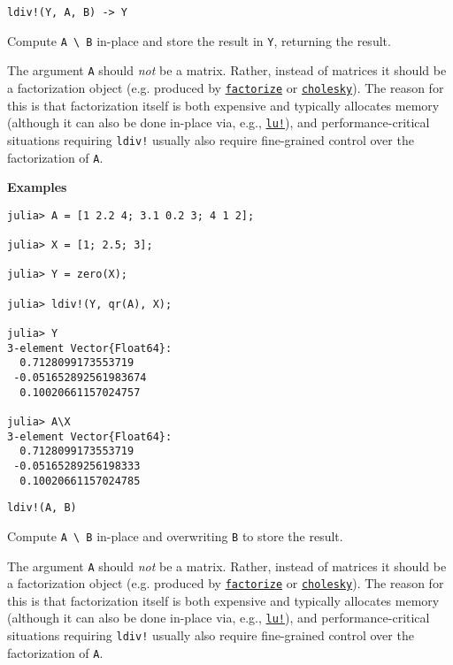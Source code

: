 \begin{adjustwidth}{2em}{0pt}


\begin{verbatim}
ldiv!(Y, A, B) -> Y
\end{verbatim}

Compute \texttt{A {\textbackslash} B} in-place and store the result in \texttt{Y}, returning the result.

The argument \texttt{A} should \emph{not} be a matrix.  Rather, instead of matrices it should be a factorization object (e.g. produced by \hyperlink{7042962205548658937}{\texttt{factorize}} or \hyperlink{7653413936706994771}{\texttt{cholesky}}). The reason for this is that factorization itself is both expensive and typically allocates memory (although it can also be done in-place via, e.g., \hyperlink{3268903080173564842}{\texttt{lu!}}), and performance-critical situations requiring \texttt{ldiv!} usually also require fine-grained control over the factorization of \texttt{A}.

\textbf{Examples}


\begin{verbatim}
julia> A = [1 2.2 4; 3.1 0.2 3; 4 1 2];

julia> X = [1; 2.5; 3];

julia> Y = zero(X);

julia> ldiv!(Y, qr(A), X);

julia> Y
3-element Vector{Float64}:
  0.7128099173553719
 -0.051652892561983674
  0.10020661157024757

julia> A\X
3-element Vector{Float64}:
  0.7128099173553719
 -0.05165289256198333
  0.10020661157024785
\end{verbatim}




\begin{lstlisting}
ldiv!(A, B)
\end{lstlisting}

Compute \texttt{A {\textbackslash} B} in-place and overwriting \texttt{B} to store the result.

The argument \texttt{A} should \emph{not} be a matrix.  Rather, instead of matrices it should be a factorization object (e.g. produced by \hyperlink{7042962205548658937}{\texttt{factorize}} or \hyperlink{7653413936706994771}{\texttt{cholesky}}). The reason for this is that factorization itself is both expensive and typically allocates memory (although it can also be done in-place via, e.g., \hyperlink{3268903080173564842}{\texttt{lu!}}), and performance-critical situations requiring \texttt{ldiv!} usually also require fine-grained control over the factorization of \texttt{A}.


\end{adjustwidth}
